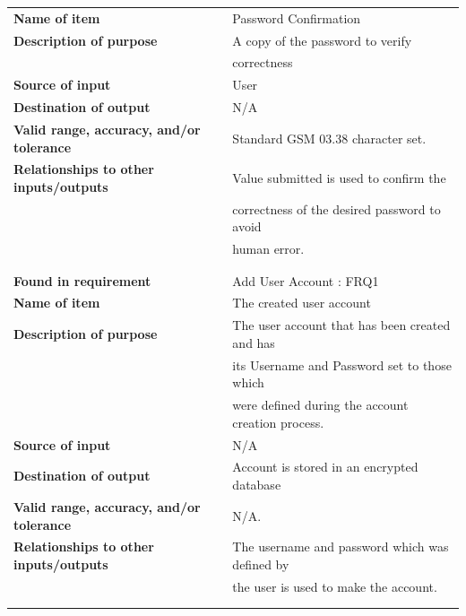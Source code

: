 \begin{tabular}{ll}
\textbf{Name of item}&Password Confirmation\\
\textbf{Description of purpose}&A copy of the password to verify \\&correctness\\
\textbf{Source of input}&User\\
\textbf{Destination of output}&N/A\\
\textbf{Valid range, accuracy, and/or tolerance}&Standard GSM 03.38 character set.\\
\textbf{Relationships to other inputs/outputs}&Value submitted is used to confirm the\\& correctness of the desired password to avoid\\& human error.\\
&\\
&\\
\textbf{Found in requirement}&Add User Account : FRQ1\\
\textbf{Name of item}&The created user account\\
\textbf{Description of purpose}&The user account that has been created and has\\& its Username and Password set to those which\\&  were defined during the account creation process. \\
\textbf{Source of input}&N/A\\
\textbf{Destination of output}&Account is stored in an encrypted database\\
\textbf{Valid range, accuracy, and/or tolerance}&N/A.\\
\textbf{Relationships to other inputs/outputs}&The username and password which was defined by\\& the user is used to make the account.\\
&\\
&\\
\end{tabular}
\newpage
